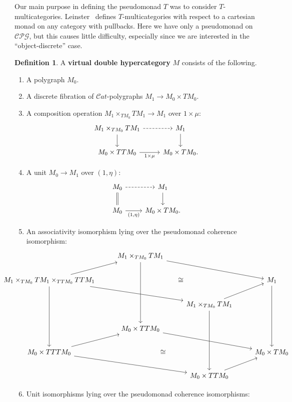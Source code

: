 \documentclass{article}
\theoremstyle{definition}
\newtheorem{defn}[thm]{Definition}
\theoremstyle{remark}
\def\Cat{\ensuremath{\mathcal{C}\mathit{at}}}
\def\cpg{\ensuremath{\mathcal{CPG}}\xspace}
\begin{document}
Our main purpose in defining the pseudomonad $T$ was to consider $T$-multicategories.
Leinster~\cite{leinster:higher-opds} defines $T$-multicategories with respect to a cartesian monad on any category with pullbacks.
Here we have only a pseudomonad on \cpg, but this causes little difficulty, especially since we are interested in the ``object-discrete'' case.

\begin{defn}
  A \textbf{virtual double hypercategory} $M$ consists of the following.
  \begin{enumerate}
  \item A polygraph $M_0$.
  \item A discrete fibration of \Cat-polygraphs $M_1 \to M_0 \times TM_0$.
  \item A composition operation $M_1 \times_{TM_0} TM_1 \to M_1$ over $1\times \mu$:
    \[
    \begin{tikzcd}
      M_1 \times_{TM_0} TM_1 \ar[r,dashed] \ar[d] & M_1\ar[d]\\
      M_0 \times TTM_0 \ar[r,"1\times \mu"'] & M_0\times TM_0.
    \end{tikzcd}
    \]
  \item A unit $M_0 \to M_1$ over $(1,\eta)$:
    \[
    \begin{tikzcd}
      M_0 \ar[r,dashed] \ar[d,equals] & M_1 \ar[d] \\
      M_0\ar[r,"{(1,\eta)}"'] & M_0\times TM_0.
    \end{tikzcd}
    \]
  \item An associativity isomorphism lying over the pseudomonad coherence isomorphism:
    \[\hspace{-2cm}
    \begin{tikzcd}
      & M_1 \times_{TM_0} TM_1 \ar[drr] \ar[ddd]\\
      M_1 \times_{TM_0} TM_1 \times_{TTM_0} TTM_1 \ar[ur] \ar[drr] \ar[ddd] \ar[rrr,phantom,"\cong"] &&&
      M_1 \ar[ddd] \\
      && M_1 \times_{TM_0} TM_1  \ar[ur]\ar[ddd]\\
      & M_0\times TTM_0\ar[drr] \\
      M_0 \times TTTM_0 \ar[ur] \ar[drr] \ar[rrr,phantom,"\cong"] &&&
      M_0\times TM_0 \\
      && M_0\times TTM_0\ar[ur]
    \end{tikzcd}\hspace{-2cm}
    \]
  \item Unit isomorphisms lying over the pseudomonad coherence isomorphisms:

\end{enumerate}
\end{defn}
\end{document}
